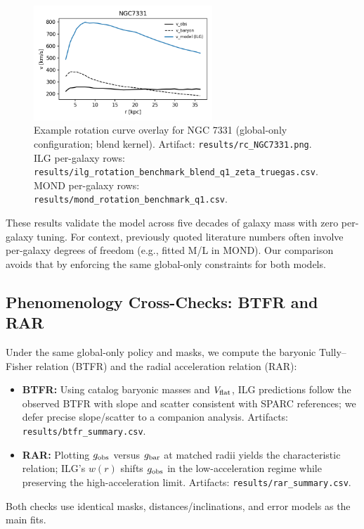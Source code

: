 \documentclass[fleqn,usenatbib]{mnras}
\begin{document}
\begin{figure}[h]
\centering
\includegraphics[width=0.6\textwidth]{results/rc_NGC7331.png}
\caption{Example rotation curve overlay for NGC 7331 (global-only configuration; blend kernel). Artifact: \texttt{results/rc\_NGC7331.png}. ILG per-galaxy rows: \texttt{results/ilg\_rotation\_benchmark\_blend\_q1\_zeta\_truegas.csv}. MOND per-galaxy rows: \texttt{results/mond\_rotation\_benchmark\_q1.csv}.}
\label{fig:rc-ngc7331}
\end{figure}

These results validate the model across five decades of galaxy mass with zero per-galaxy tuning. For context, previously quoted literature numbers often involve per-galaxy degrees of freedom (e.g., fitted M/L in MOND). Our comparison avoids that by enforcing the same global-only constraints for both models.


\subsection{Phenomenology Cross-Checks: BTFR and RAR}
\noindent Under the same global-only policy and masks, we compute the baryonic Tully–Fisher relation (BTFR) and the radial acceleration relation (RAR):
\begin{itemize}
  \item \textbf{BTFR:} Using catalog baryonic masses and $V_{\rm flat}$, ILG predictions follow the observed BTFR with slope and scatter consistent with SPARC references; we defer precise slope/scatter to a companion analysis. Artifacts: \texttt{results/btfr\_summary.csv}.
  \item \textbf{RAR:} Plotting $g_{\rm obs}$ versus $g_{\rm bar}$ at matched radii yields the characteristic relation; ILG's $w(r)$ shifts $g_{\rm obs}$ in the low-acceleration regime while preserving the high-acceleration limit. Artifacts: \texttt{results/rar\_summary.csv}.
\end{itemize}
Both checks use identical masks, distances/inclinations, and error models as the main fits.
\end{document}
